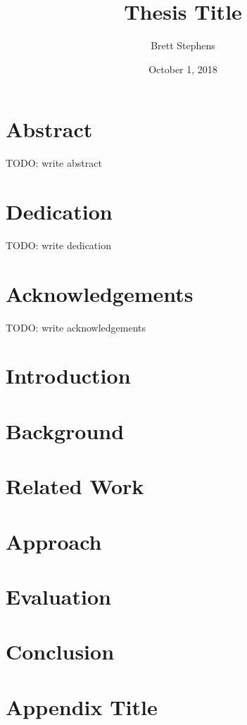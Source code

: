 \documentclass[12pt,twoside]{report}
\title{Thesis Title}
\author{Brett Stephens}
\date{October 1, 2018}
\begin{document}




\chapter*{Abstract}
TODO: write abstract

\chapter*{Dedication}
TODO: write dedication

\chapter*{Acknowledgements}
TODO: write acknowledgements 

\tableofcontents

\chapter{Introduction}


\chapter{Background}


\chapter{Related Work}


\chapter{Approach}


\chapter{Evaluation}


\chapter{Conclusion}


\appendix
\chapter{Appendix Title}


\printbibliography
\end{document}
